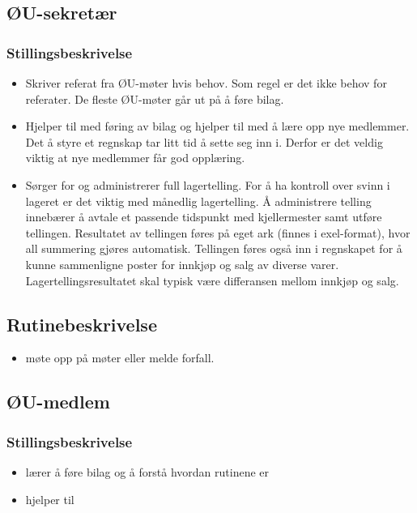 \subsection{ØU-sekretær}

\subsubsection{Stillingsbeskrivelse}

\begin{itemize}
\item{} Skriver referat fra ØU-møter hvis behov. Som regel er det ikke
  behov for referater. De fleste ØU-møter går ut på å føre bilag.
\item{} Hjelper til med føring av bilag og hjelper
  til med å lære opp nye medlemmer. Det å styre et regnskap tar litt
  tid å sette seg inn i. Derfor er det veldig viktig at nye medlemmer
  får god opplæring.
\item{} Sørger for og administrerer full lagertelling. For å ha
  kontroll over svinn i lageret er det viktig med månedlig
  lagertelling. Å administrere telling innebærer å avtale et passende
  tidspunkt med kjellermester samt utføre tellingen. Resultatet av
  tellingen føres på eget ark (finnes i exel-format), hvor all
  summering gjøres automatisk. Tellingen føres også inn i regnskapet
  for å kunne sammenligne poster for innkjøp og salg av diverse
  varer. Lagertellingsresultatet skal typisk være differansen mellom
  innkjøp og salg.
\end{itemize}

\subsection{Rutinebeskrivelse}
\begin{itemize}
\item{} møte opp på møter eller melde forfall.
\end{itemize}


\subsection{ØU-medlem}
\subsubsection{Stillingsbeskrivelse}

\begin{itemize}
\item{} lærer å føre bilag og å forstå hvordan rutinene er
\item{} hjelper til 
\end{itemize}

